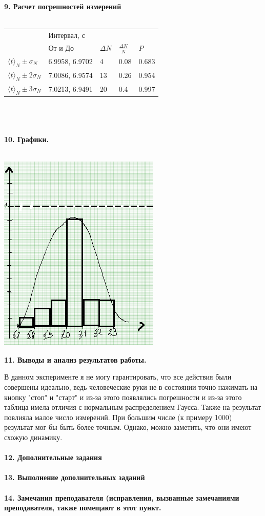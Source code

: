 \documentclass[14pt]{article}
\begin{document}
	\textbf{9. Расчет погрешностей измерений} \\ \\ 
	\begin{tabular}{|p{3cm}|p{3cm}|p{3cm}|p{3cm}|p{3cm}|}		
		\hline
		& Интервал, с &  & & \\
		& От и До &$\Delta N$ & $\frac{\Delta N}{N}$ & $P$ \\
		\hline 
		$\langle t \rangle_N \pm \sigma_N$ & 6.9958, 6.9702& 4 & 0.08 & 0.683 \\
		\hline 
		$\langle t \rangle_N \pm 2\sigma_N$ & 7.0086, 6.9574& 13 & 0.26 & 0.954\\
		\hline 
		$\langle t \rangle_N \pm 3\sigma_N$ & 7.0213, 6.9491& 20 & 0.4 & 0.997 \\
		\hline
	\end{tabular} \\ \\ \\
	\textbf{10. Графики.} \\ \\
	\begin{center}
	\includegraphics{gistogramma.png} 
	\end{center}
	\textbf{11. Выводы и анализ результатов работы.} 
	\par В данном эксперименте я не могу гарантировать, что все действия были совершены идеально, ведь человеческие руки не в состоянии точно нажимать на кнопку "стоп" и "старт" и из-за этого появлялись погрешности и из-за этого таблица имела отличия с нормальным распределением Гаусса. Также на результат повлияла малое число измерений. При большим числе (к примеру 1000) результат мог бы быть более точным. Однако, можно заметить, что они имеют схожую динамику. \\ \\
	\textbf{12. Дополнительные задания} 
	\\ \\
	\textbf{13. Выполнение дополнительных заданий}
	\\ \\
	\textbf{14.	Замечания преподавателя (исправления, вызванные замечаниями преподавателя, также помещают в этот пункт.}
\end{document}
